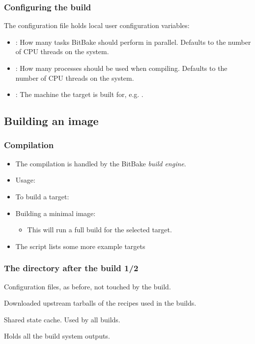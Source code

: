 \begin{frame}
  \frametitle{Configuring the build}
    The  configuration file holds local
    user configuration variables:
    \begin{itemize}
      \item {}: How many tasks BitBake should perform
        in parallel. Defaults to the number of CPU threads on the system.
      \item {}: How many processes should be used when
        compiling. Defaults to the number of CPU threads on the system.
      \item {}: The machine the target is built for, e.g.
        .
    \end{itemize}
\end{frame}

\subsection{Building an image}

\begin{frame}
  \frametitle{Compilation}
  \begin{itemize}
    \item The compilation is handled by the BitBake {\em build
      engine}.
    \item Usage: 
    \item To build a target: 
    \item Building a minimal image: 
    \begin{itemize}
      \item This will run a full build for the selected target.
    \end{itemize}
    \item The  script lists some more example targets
  \end{itemize}
\end{frame}

\begin{frame}
  \frametitle{The  directory after the build 1/2}
  \begin{description}[style=nextline]
    \item[conf/] Configuration files, as before, not touched by the build.
    \item[downloads/] Downloaded upstream tarballs of the recipes
      used in the builds.
    \item[sstate-cache/] Shared state cache. Used by all builds.
    \item[tmp/] Holds all the build system outputs.
  \end{description}
\end{frame}

